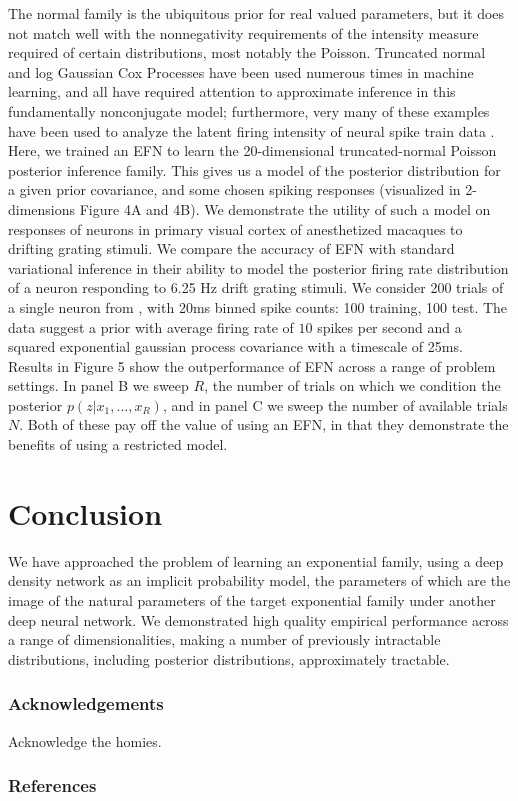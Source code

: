 \documentclass[twoside]{article}
\begin{document}
The normal family is the ubiquitous prior for real valued parameters, but it does not match well with the nonnegativity requirements of the intensity measure required of certain distributions, most notably the Poisson.  Truncated normal and log Gaussian Cox Processes have been used numerous times in machine learning, and all have required attention to approximate inference in this fundamentally nonconjugate model; furthermore, very many of these examples have been used to analyze the latent firing intensity of neural spike train data \cite{cunningham2008fast,cunningham2008inferring,adams2009tractable,gao2016linear}.
Here, we trained an EFN to learn the 20-dimensional truncated-normal Poisson posterior inference family.  This gives us a model of the posterior distribution for a given prior covariance, and some chosen spiking responses (visualized in 2-dimensions Figure 4A and 4B).  We demonstrate the utility of such a model on responses of neurons in primary visual cortex of anesthetized macaques to drifting grating stimuli.  We compare the accuracy of EFN with standard variational inference in their ability to model the posterior firing rate distribution of a neuron responding to 6.25 Hz drift grating stimuli.  We consider 200 trials of a single neuron from \cite{smith2008spatial}, with 20ms binned spike counts: 100 training, 100 test. The data suggest a prior with average firing rate of $10$ spikes per second and a squared exponential gaussian process covariance with a timescale of 25ms.  Results in Figure 5 show the outperformance of EFN across a range of problem settings.  In panel B we sweep $R$, the number of trials on which we condition the posterior $p(z|x_1,...,x_R)$, and in panel C we sweep the number of available trials $N$.  Both of these pay off the value of using an EFN, in that they demonstrate the benefits of using a restricted model.

\section{Conclusion}

We have approached the problem of learning an exponential family, using a deep density network as an implicit probability model, the parameters of which are the image of the natural parameters of the target exponential family under another deep neural network.  
We demonstrated high quality empirical performance across a range of dimensionalities, making a number of previously intractable distributions, including posterior distributions, approximately tractable.

\subsubsection*{Acknowledgements}

Acknowledge the homies.

\subsubsection*{References}


\end{document}
